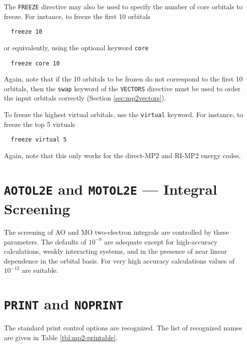 The \verb+FREEZE+ directive may also be used to specify the number of 
core orbitals to freeze.  For instance, to freeze the first 10 orbitals
\begin{verbatim}
  freeze 10
\end{verbatim}
or equivalently, using the optional keyword \verb+core+
\begin{verbatim}
  freeze core 10
\end{verbatim}
Again, note that if the 10 orbitals to be frozen do not correspond to
the first 10 orbitals, then the \verb+swap+ keyword of the
\verb+VECTORS+ directive must be used to order the input orbitals
correctly (Section \ref{sec:mp2vectors}).

To freeze the highest virtual orbitals, use the \verb+virtual+
keyword.  For instance, to freeze the top 5 virtuals
\begin{verbatim}
  freeze virtual 5
\end{verbatim}
Again, note that this only works for the direct-MP2 and RI-MP2 energy
codes.

\section{{\tt AOTOL2E} and {\tt MOTOL2E} --- Integral Screening}

The screening of AO and MO two-electron integrals are controlled by
these parameters.  The defaults of $10^{-9}$ are adequate except for
high-accuracy calculations, weakly interacting systems, and in the
presence of near linear dependence in the orbital basis.  For very
high accuracy calculations values of $10^{-12}$ are suitable.

\section{{\tt PRINT} and {\tt NOPRINT}}

The standard print control options are recognized.  The list of
recognized names are given in Table \ref{tbl:mp2-printable}.

